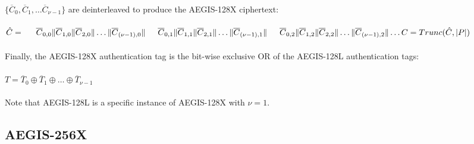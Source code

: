 \documentclass[envcountsame,runningheads,notitlepage]{llncs}
\begin{document}
\paragraph{}

$\{ \overline{C}_0, \overline{C}_1, \ldots \overline{C}_{\nu-1} \}$ are deinterleaved to produce the AEGIS-128X ciphertext:

\paragraph{}

\begin{math}
  \hat{C} = \\
  \indent \overline{C}_{0,0} \| \overline{C}_{1,0} \| \overline{C}_{2,0} \| \ldots \| \overline{C}_{(\nu-1),0} \| \\
  \indent \overline{C}_{0,1} \| \overline{C}_{1,1} \| \overline{C}_{2,1} \| \ldots \| \overline{C}_{(\nu-1),1} \| \\
  \indent \overline{C}_{0,2} \| \overline{C}_{1,2} \| \overline{C}_{2,2} \| \ldots \| \overline{C}_{(\nu-1),2} \| \ldots \\
  \\
  C = Trunc(\hat{C}, \lvert P \rvert)
\end{math}

\paragraph{}

Finally, the AEGIS-128X authentication tag is the bit-wise exclusive OR of the AEGIS-128L authentication tags:

\paragraph{}

\begin{math}
  T = \overline{T}_0 \oplus \overline{T}_1 \oplus \ldots \oplus \overline{T}_{\nu-1}
\end{math}

\paragraph{}

Note that AEGIS-128L is a specific instance of AEGIS-128X with $\nu=1$.

\subsection{AEGIS-256X}
\end{document}
